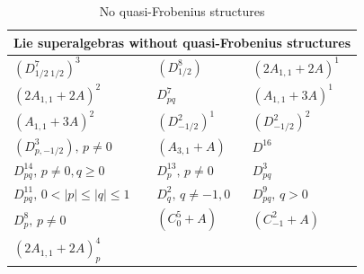 \documentclass[12pt]{amsart}
\begin{document}
\begin{table}[ht]
\centering
\renewcommand{\arraystretch}{1.2}
\begin{tabular}{lll}
\hline
\multicolumn{3}{c}{Lie superalgebras without quasi-Frobenius structures} \\
\hline
$(D_{1/2\; 1/2}^7)^3$ & $(D^8_{1/2})$  &  
$(2A_{1,1}+2A)^1$ \\[2mm] 
$(2A_{1,1}+2A)^2$ & 
$D^7_{pq}$ & $(A_{1,1}+3A)^1$\\[2mm]
 $(A_{1,1}+3A)^2$&
$(D^2_{-1/2})^1$ & 
$(D^2_{-1/2})^2$ \\[2mm] $(D^3_{p,-1/2}), \, p\not =0$& 
$(A_{3,1}+A)$&  
$D^{16}$\\[2mm]  
$D^{14}_{pq}, \, p\not =0, q\geq 0$& 
$D^{13}_p, \, p\not = 0$
& $D^3_{pq}$\\[2mm]
$D^{11}_{pq}, \, 0<|p|\leq |q|\leq 1$& 
$D^2_q, \, q\not = -1,0$
& 
$D^9_{pq},\, q>0$\\[2mm] 
$D^8_p, \, p\not =0$
&
$(C_0^5+A)$ &
 $(C^2_{-1}+A)$\\[2mm]  $(2A_{1,1}+2A)^4_p$  & &\\
\hline
\end{tabular}
\caption{No quasi-Frobenius structures}
\label{tab:NoQF}
\end{table}
\end{document}
